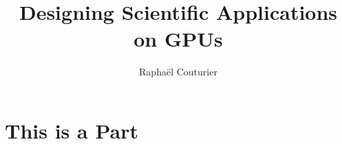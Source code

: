 \documentclass[sunil1,ChapterTOCs]{sunil}
\begin{document}
\bibliographyunit[\chapter]



\title{Designing Scientific Applications on GPUs }

\author{Raphaël Couturier}

\maketitle

\frontmatter



\listoffigures
\listoftables
\tableofcontents

\mainmatter



\setcounter{page}{1}
\part{This is a Part}







\clearpage
\printindex
\end{document}
